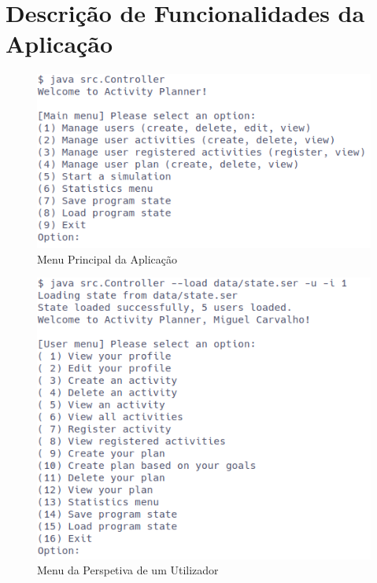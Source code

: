 \documentclass[a4paper,12pt]{scrreprt}
\begin{document}
\chapter{Descrição de Funcionalidades da Aplicação}
\begin{figure}[!ht]
    \centering
    \includegraphics[width=\textwidth]{images/mainMenu.png}
    \caption{Menu Principal da Aplicação}
    \label{fig:menu-main}
\end{figure}

\begin{figure}[!ht]
    \centering
    \includegraphics[width=\textwidth]{images/userMenu.png}
    \caption{Menu da Perspetiva de um Utilizador}
    \label{fig:menu-user}
\end{figure}

\clearpage
\end{document}
